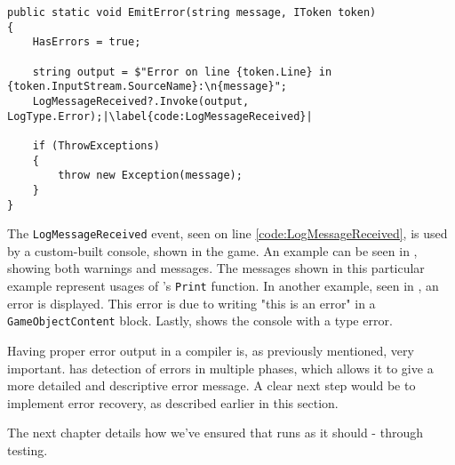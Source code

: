 \begin{lstlisting}[language=CSharp, caption={\texttt{EmitError} in the \texttt{DazelLogger}.}, label={lst:EmitErrorCode}, escapechar=|]
public static void EmitError(string message, IToken token)
{
    HasErrors = true;
    
    string output = $"Error on line {token.Line} in {token.InputStream.SourceName}:\n{message}";
    LogMessageReceived?.Invoke(output, LogType.Error);|\label{code:LogMessageReceived}|

    if (ThrowExceptions)
    {
        throw new Exception(message);
    }
}
\end{lstlisting}

The \texttt{LogMessageReceived} event, seen on line \ref{code:LogMessageReceived}, is used by a custom-built console, shown in the \dazel{} game. An example can be seen in , showing both warnings and messages. The messages shown in this particular example represent usages of \dazel{}'s \texttt{Print} function. In another example, seen in , an error is displayed. This error is due to writing "this is an error" in a \texttt{GameObjectContent} block. Lastly,  shows the \dazel{} console with a type error.


Having proper error output in a compiler is, as previously mentioned, very important. \dazel{} has detection of errors in multiple phases, which allows it to give a more detailed and descriptive error message. A clear next step would be to implement error recovery, as described earlier in this section.

The next chapter details how we've ensured that \dazel{} runs as it should - through testing.
